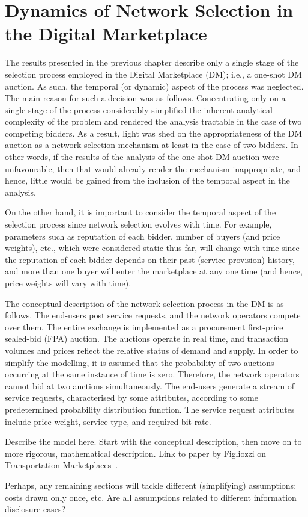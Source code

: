 \chapter{Dynamics of Network Selection in the Digital Marketplace} %
\label{cha:dynamics_of_network_selection_in_the_digital_marketplace}

\minitoc
\vspace{10mm}

The results presented in the previous chapter describe only a single stage of the selection process employed in the Digital Marketplace (DM); i.e., a one-shot DM auction. As such, the temporal (or dynamic) aspect of the process was neglected. The main reason for such a decision was as follows. Concentrating only on a single stage of the process considerably simplified the inherent analytical complexity of the problem and rendered the analysis tractable in the case of two competing bidders. As a result, light was shed on the appropriateness of the DM auction as a network selection mechanism at least in the case of two bidders. In other words, if the results of the analysis of the one-shot DM auction were unfavourable, then that would already render the mechanism inappropriate, and hence, little would be gained from the inclusion of the temporal aspect in the analysis.

On the other hand, it is important to consider the temporal aspect of the selection process since network selection evolves with time. For example, parameters such as reputation of each bidder, number of buyers (and price weights), etc., which were considered static thus far, will change with time since the reputation of each bidder depends on their past (service provision) history, and more than one buyer will enter the marketplace at any one time (and hence, price weights will vary with time).

The conceptual description of the network selection process in the DM is as follows. The end-users post service requests, and the network operators compete over them. The entire exchange is implemented as a procurement first-price sealed-bid (FPA) auction. The auctions operate in real time, and transaction volumes and prices reflect the relative status of demand and supply. In order to simplify the modelling, it is assumed that the probability of two auctions occurring at the same instance of time is zero. Therefore, the network operators cannot bid at two auctions simultaneously. The end-users generate a stream of service requests, characterised by some attributes, according to some predetermined probability distribution function. The service request attributes include price weight, service type, and required bit-rate.

Describe the model here. Start with the conceptual description, then move on to more rigorous, mathematical description. Link to paper by Figliozzi on Transportation Marketplaces~\cite{FigliozziJaillet2008}.

Perhaps, any remaining sections will tackle different (simplifying) assumptions: costs drawn only once, etc. Are all assumptions related to different information disclosure cases?


